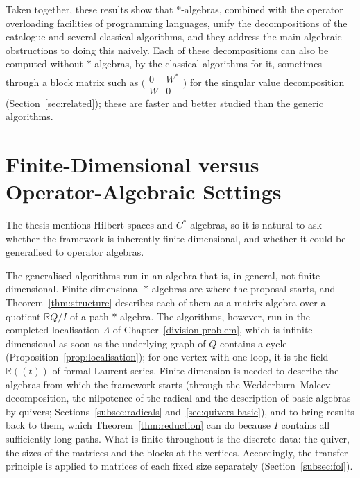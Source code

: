 \documentclass[12pt, a4paper]{report}
\theoremstyle{plain}
\theoremstyle{definition}
\theoremstyle{remark}
\theoremstyle{plain}
\newcommand{\RR}{\mathbb{R}}
\begin{document}
Taken together, these results show that $*$-algebras, combined with the operator overloading facilities of programming languages, unify the decompositions of the catalogue and several classical algorithms, and they address the main algebraic obstructions to doing this naively. Each of these decompositions can also be computed without $*$-algebras, by the classical algorithms for it, sometimes through a block matrix such as $\bigl(\begin{smallmatrix}0&W^*\\W&0\end{smallmatrix}\bigr)$ for the singular value decomposition (Section~\ref{sec:related}); these are faster and better studied than the generic algorithms.

\section{Finite-Dimensional versus Operator-Algebraic Settings}
\label{sec:operator}
The thesis mentions Hilbert spaces and $C^*$-algebras, so it is natural to ask whether the framework is inherently finite-dimensional, and whether it could be generalised to operator algebras.

The generalised algorithms run in an algebra that is, in general, not finite-dimensional. Finite-dimensional $*$-algebras are where the proposal starts, and Theorem~\ref{thm:structure} describes each of them as a matrix algebra over a quotient $\RR Q/I$ of a path $*$-algebra. The algorithms, however, run in the completed localisation $\Lambda$ of Chapter~\ref{division-problem}, which is infinite-dimensional as soon as the underlying graph of $Q$ contains a cycle (Proposition~\ref{prop:localisation}); for one vertex with one loop, it is the field $\RR((t))$ of formal Laurent series. Finite dimension is needed to describe the algebras from which the framework starts (through the Wedderburn--Malcev decomposition, the nilpotence of the radical and the description of basic algebras by quivers; Sections~\ref{subsec:radicals} and~\ref{sec:quivers-basic}), and to bring results back to them, which Theorem~\ref{thm:reduction} can do because $I$ contains all sufficiently long paths. What is finite throughout is the discrete data: the quiver, the sizes of the matrices and the blocks at the vertices. Accordingly, the transfer principle is applied to matrices of each fixed size separately (Section~\ref{subsec:fol}).
\end{document}
